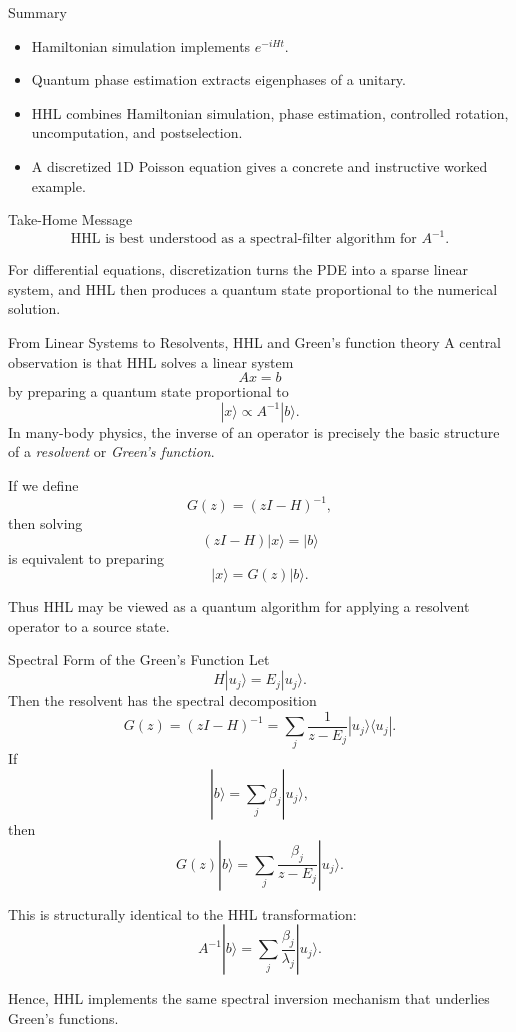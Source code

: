 \documentclass{beamer}
\begin{document}
\begin{frame}{Summary}
\begin{itemize}
    \item Hamiltonian simulation implements \(e^{-iHt}\).
    \item Quantum phase estimation extracts eigenphases of a unitary.
    \item HHL combines Hamiltonian simulation, phase estimation, controlled rotation, uncomputation, and postselection.
    \item A discretized 1D Poisson equation gives a concrete and instructive worked example.
\end{itemize}
\end{frame}

\begin{frame}{Take-Home Message}
\[
\boxed{
\text{HHL is best understood as a spectral-filter algorithm for } A^{-1}.
}
\]

For differential equations, discretization turns the PDE into a sparse linear system, and HHL then produces a quantum state proportional to the numerical solution.
\end{frame}




\begin{frame}{From Linear Systems to Resolvents, HHL and Green's function theory}
A central observation is that HHL solves a linear system
\[
A x = b
\]
by preparing a quantum state proportional to
\[
|x\rangle \propto A^{-1}|b\rangle.
\]
In many-body physics, the inverse of an operator is precisely the basic structure of a
\emph{resolvent} or \emph{Green's function}.

If we define
\[
G(z) = (z I - H)^{-1},
\]
then solving
\[
(zI-H)|x\rangle = |b\rangle
\]
is equivalent to preparing
\[
|x\rangle = G(z)|b\rangle.
\]

Thus HHL may be viewed as a quantum algorithm for applying a resolvent operator to a source state.
\end{frame}


\begin{frame}{Spectral Form of the Green's Function}
Let
\[
H|u_j\rangle = E_j |u_j\rangle.
\]
Then the resolvent has the spectral decomposition
\[
G(z) = (zI-H)^{-1}
= \sum_j \frac{1}{z-E_j} |u_j\rangle \langle u_j|.
\]
If
\[
|b\rangle = \sum_j \beta_j |u_j\rangle,
\]
then
\[
G(z)|b\rangle = \sum_j \frac{\beta_j}{z-E_j}|u_j\rangle.
\]

This is structurally identical to the HHL transformation:
\[
A^{-1}|b\rangle
=
\sum_j \frac{\beta_j}{\lambda_j}|u_j\rangle.
\]

Hence, HHL implements the same spectral inversion mechanism that underlies Green's functions.
\end{frame}
\end{document}
